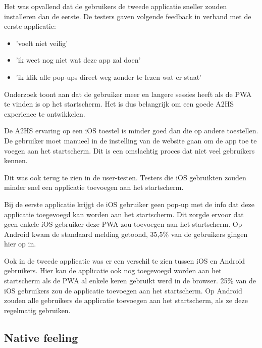		Het was opvallend dat de gebruikers de tweede applicatie sneller zouden installeren dan de eerste. De testers gaven volgende feedback in verband met de eerste applicatie:
		\begin{itemize}
	  		\item 'voelt niet veilig'
			\item 'ik weet nog niet wat deze app zal doen'
			\item 'ik klik alle pop-ups direct weg zonder te lezen wat er staat'
	  	\end{itemize}	

		Onderzoek \autocite{LePage2020b} toont aan dat de gebruiker meer en langere sessies heeft als de PWA te vinden is op het startscherm. Het is dus belangrijk om een goede A2HS experience te ontwikkelen.
		
		De A2HS ervaring op een iOS toestel is minder goed dan die op andere toestellen. De gebruiker moet manueel in de instelling van de website gaan om de app toe te voegen aan het startscherm. Dit is een omslachtig proces dat niet veel gebruikers kennen. 
		
		Dit was ook terug te zien in de user-testen. Testers die iOS gebruikten zouden minder snel een applicatie toevoegen aan het startscherm. 
		
		Bij de eerste applicatie krijgt de iOS gebruiker geen pop-up met de info dat deze applicatie toegevoegd kan worden aan het startscherm. Dit zorgde ervoor dat geen enkele iOS gebruiker deze PWA zou toevoegen aan het startscherm. Op Android kwam de standaard melding getoond, 35,5\% van de gebruikers gingen hier op in.
		
		Ook in de tweede applicatie was er een verschil te zien tussen iOS en Android gebruikers.	
		Hier kan de applicatie ook nog toegevoegd worden aan het startscherm als de PWA al enkele keren gebruikt werd in de browser.
		25\% van de iOS gebruikers zou de applicatie toevoegen aan het startscherm. Op Android zouden alle gebruikers de applicatie toevoegen aan het startscherm, als ze deze regelmatig gebruiken. 
		
		
		
		
	
	\subsection{Native feeling}
		
